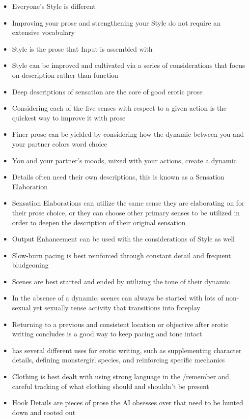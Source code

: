 \documentclass[Source-main.tex]{subfiles}
\begin{document}
\begin{itemize}
\item{Everyone's Style is different}
\item{Improving your prose and strengthening your Style do not require an extensive vocabulary}
\item{Style is the prose that Input is assembled with}
\item{Style can be improved and cultivated via a series of considerations that focus on description rather than function}
\item{Deep descriptions of sensation are the core of good erotic prose}
\item{Considering each of the five senses with respect to a given action is the quickest way to improve it with prose}
\item{Finer prose can be yielded by considering how the dynamic between you and your partner colors word choice}
\item{You and your partner's moods, mixed with your actions, create a dynamic}
\item{Details often need their own descriptions, this is known as a Sensation Elaboration}
\item{Sensation Elaborations can utilize the same sense they are elaborating on for their prose choice, or they can choose other primary senses to be utilized in order to deepen the description of their original sensation}
\item{Output Enhancement can be used with the considerations of Style as well}

\item{Slow-burn pacing is best reinforced through constant detail and frequent bludgeoning}
\item{Scenes are best started and ended by utilizing the tone of their dynamic}
\item{In the absence of a dynamic, scenes can always be started with lots of non-sexual yet sexually tense activity that transitions into foreplay}
\item{Returning to a previous and consistent location or objective after erotic writing concludes is a good way to keep pacing and tone intact}
\item{\wi has several different uses for erotic writing, such as supplementing character details, defining monstergirl species, and reinforcing specific mechanics}
\item{Clothing is best dealt with using strong language in the /remember and careful tracking of what clothing should and shouldn't be present}
\item{Hook Details are pieces of prose the AI obsesses over that need to be hunted down and rooted out}

\end{itemize}
\end{document}
